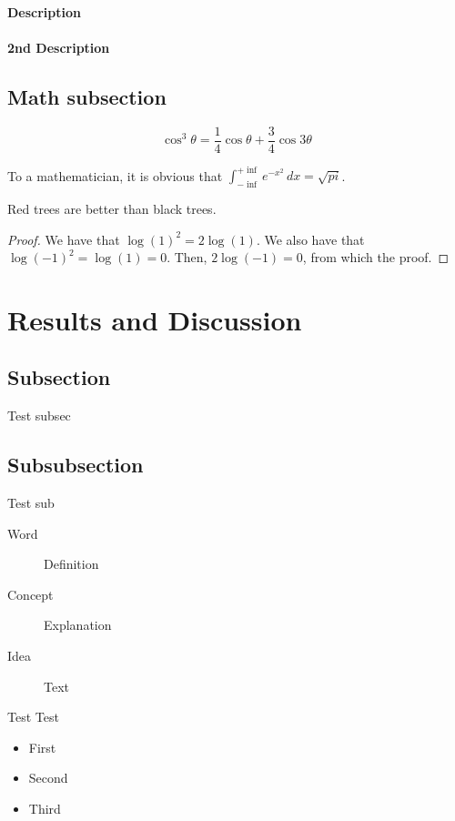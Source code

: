 \documentclass[10pt, 
a4paper, 
oneside, 
headinclude, footinclude, 
BCOR5mm]
{scrartcl}
\begin{document}
\paragraph{Description}
\paragraph{2nd Description}

\subsection{Math subsection}

\begin{equation}
    \cos^3 \theta = \frac{1}{4}\cos\theta + \frac{3}{4}\cos 3\theta
    \label{eq:refname2}
\end{equation}

\begin{definition}[Gauss]
    To a mathematician, it is obvious that
    $\int_{-\inf}^{+\inf} e^{-x^2}\, dx=\sqrt{pi}$.
\end{definition}

\begin{theorem}
    Red trees are better than black trees.
\end{theorem}

\begin{proof}
    We have that $\log(1)^2 = 2\log(1)$.
    We also have that $\log(-1)^2 = \log(1) = 0$.
    Then, $2\log(-1) = 0$, from which the proof.
\end{proof}

\section{Results and Discussion}

\subsection{Subsection}
Test subsec

\subsection{Subsubsection}
Test sub

\begin{description}
    \item[Word] Definition
    \item[Concept] Explanation
    \item[Idea] Text
\end{description}

Test Test

\begin{itemize}[noitemsep]
    \item First
    \item Second
    \item Third
\end{itemize}
\end{document}
